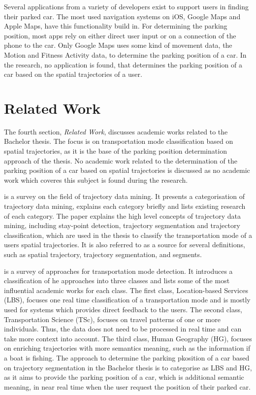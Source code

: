 Several applications from a variety of developers exist to support users in finding their parked car. The most used navigation systems on iOS, Google Maps and Apple Maps, have this functionality build in. For determining the parking position, most apps rely on either direct user input or on a connection of the phone to the car. Only Google Maps uses some kind of movement data, the Motion and Fitness Activity data, to determine the parking position of a car. In the research, no application is found, that determines the parking position of a car based on the spatial trajectories of a user.


\section{Related Work}
The fourth section, \textit{Related Work}, discusses academic works related to the Bachelor thesis. The focus is on transportation mode classification based on spatial trajectories, as it is the base of the parking position determination approach of the thesis. No academic work related to the determination of the parking position of a car based on spatial trajectories is discussed as no academic work which coveres this subject is found during the research.

\cite{Zheng:2015:TDM:2764959.2743025} is a survey on the field of trajectory data mining. It presents a categorisation of trajectory data mining, explains each category briefly and lists existing research of each category.\newline
The paper explains the high level concepts of trajectory data mining, including stay-point detection, trajectory segmentation and trajectory classification, which are used in the thesis to classify the transportation mode of a users spatial trajectories. It is also referred to as a source for several definitions, such as spatial trajectory, trajectory segmentation, and segments.

\cite{Prelipcean2017} is a survey of approaches for transportation mode detection. It introduces a classification of he approaches into three classes and lists some of the most influential academic works for each class. The first class, Location-based Services (LBS), focuses one real time classification of a transportation mode and is mostly used for systems which provides direct feedback to the users. The second class, Transportation Science (TSc), focuses on travel patterns of one or more individuals. Thus, the data does not need to be processed in real time and can take more context into account. The third class, Human Geography (HG), focuses on enriching trajectories with more semantics meaning, such as the information if a boat is fishing.\newline
The approach to determine the parking pkosition of a car based on trajectory segmentation in the Bachelor thesis is to categorise as LBS and HG, as it aims to provide the parking position of a car, which is additional semantic meaning, in near real time when the user request the position of their parked car. 

